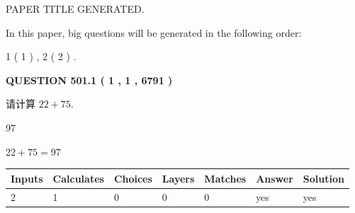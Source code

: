 \documentclass{ctexart}
\begin{document}
   
 \vspace{0.2in}
 
 
 
 
   
   
 PAPER TITLE GENERATED.
   
   
   
\vspace{0.2in}
   
In this paper, big questions will be generated in the following order: 
   
   
   1 ( 1 )
 ,
   2 ( 2 )
 .
  
\vspace{0.2in}
  
{\textbf{\Large{QUESTION
501.1 
 ( 1 , 1 , 6791 )
}}}
  
  
 
请计算 $ %
22 +  %
75 $.
 
 
 
\noindent{}
 
 

97
 
 
\noindent{}
 
 

 
 
 
\noindent{}
 
 

$ %
22 +  %
75=   %
97$
 
 
\noindent{}
 
 

 
   
   
   
   
\noindent\begin{tabular}{|l|l|l|l|l|l|l|}
 \hline
Inputs & Calculates & Choices & Layers & Matches & Answer & Solution \\ \hline
 2  & 
 1  & 
 0
  & 
 0  & 
 0  & 
  yes & 
  yes 
  \\ \hline
 \end{tabular}
   
   
   
   
\noindent{}
   
   
  
\end{document}
